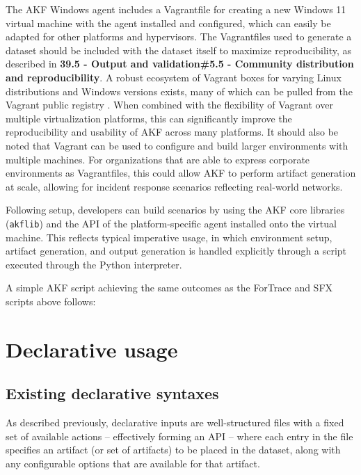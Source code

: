 The AKF Windows agent includes a Vagrantfile for creating a new Windows
11 virtual machine with the agent installed and configured, which can
easily be adapted for other platforms and hypervisors. The Vagrantfiles
used to generate a dataset should be included with the dataset itself to
maximize reproducibility, as described in \textbf{39.5 - Output and
validation\#5.5 - Community distribution and reproducibility}. A robust
ecosystem of Vagrant boxes for varying Linux distributions and Windows
versions exists, many of which can be pulled from the Vagrant public
registry \cite{hashicorpHashiCorpCloudPlatform}. When combined with
the flexibility of Vagrant over multiple virtualization platforms, this
can significantly improve the reproducibility and usability of AKF
across many platforms. It should also be noted that Vagrant can be used
to configure and build larger environments with multiple machines. For
organizations that are able to express corporate environments as
Vagrantfiles, this could allow AKF to perform artifact generation at
scale, allowing for incident response scenarios reflecting real-world
networks.

Following setup, developers can build scenarios by using the AKF core
libraries (\passthrough{\lstinline!akflib!}) and the API of the
platform-specific agent installed onto the virtual machine. This
reflects typical imperative usage, in which environment setup, artifact
generation, and output generation is handled explicitly through a script
executed through the Python interpreter.

A simple AKF script achieving the same outcomes as the ForTrace and SFX
scripts above follows:

\section{Declarative usage}\label{declarative-usage}

\subsection{Existing declarative
syntaxes}\label{existing-declarative-syntaxes}

As described previously, declarative inputs are well-structured files
with a fixed set of available actions -- effectively forming an API --
where each entry in the file specifies an artifact (or set of artifacts)
to be placed in the dataset, along with any configurable options that
are available for that artifact.

